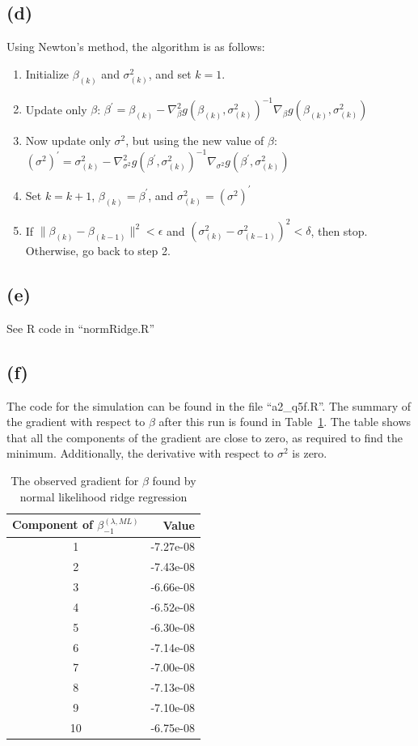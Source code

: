 \documentclass{article}\usepackage[]{graphicx}\usepackage[]{color}
\begin{document}
\subsection*{(d)}
Using Newton's method, the algorithm is as follows:
\begin{enumerate}
  \item Initialize $\beta_{(k)}$ and $\sigma^2_{(k)}$, and set $k=1$.
  \item Update only $\beta$: $\beta^\prime=\beta_{(k)}-\nabla^2_\beta g(\beta_{(k)},\sigma^2_{(k)})^{-1}\nabla_\beta g(\beta_{(k)},\sigma^2_{(k)})$
  \item Now update only $\sigma^2$, but using the new value of $\beta$:  $(\sigma^2)^\prime = \sigma^2_{(k)} - \nabla^2_{\sigma^2} g(\beta^\prime,\sigma^2_{(k)})^{-1} \nabla_{\sigma^2} g(\beta^\prime,\sigma^2_{(k)})$
  \item Set $k=k+1$, $\beta_{(k)} = \beta^\prime$, and $\sigma^2_{(k)} = (\sigma^2)^\prime $
  \item If $\|\beta_{(k)}-\beta_{(k-1)}\|^2 < \epsilon$ and $(\sigma^2_{(k)}-\sigma^2_{(k-1)})^2 < \delta$, then stop.  Otherwise, go back to step 2.
\end{enumerate}

\subsection*{(e)}
See R code in ``normRidge.R''

\subsection*{(f)}
The code for the simulation can be found in the file ``a2\_q5f.R''.  The summary of the gradient with respect to $\beta$ after this run is found in Table~\ref{tab:normridge}.  The table shows that all the components of the gradient are close to zero, as required to find the minimum.  Additionally, the derivative with respect to $\sigma^2$ is zero.

\begin{table}[ht]
\centering
\begin{tabular}{|c|r|}
  \hline
 Component of $\beta^{(\lambda,ML)}_{-1}$ & Value \\ 
  \hline
  \hline
1 & -7.27e-08 \\ 
  2 & -7.43e-08 \\ 
  3 & -6.66e-08 \\ 
  4 & -6.52e-08 \\ 
  5 & -6.30e-08 \\ 
  6 & -7.14e-08 \\ 
  7 & -7.00e-08 \\ 
  8 & -7.13e-08 \\ 
  9 & -7.10e-08 \\ 
  10 & -6.75e-08 \\ 
   \hline
\end{tabular}
\caption{The observed gradient for $\beta$ found by normal likelihood ridge regression}
\label{tab:normridge}
\end{table}
\end{document}
